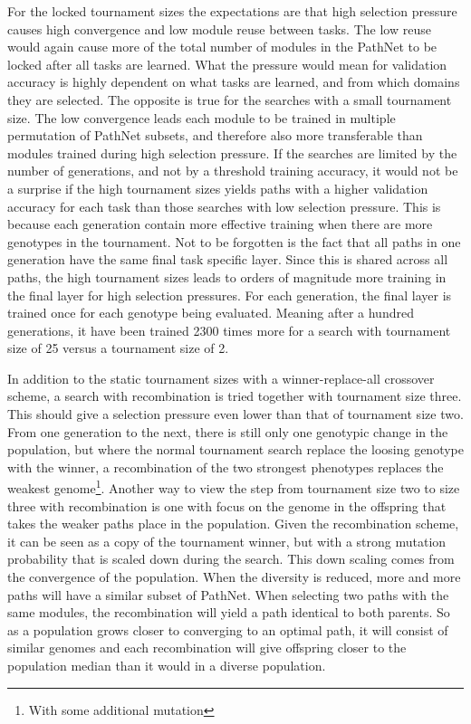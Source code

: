 For the locked tournament sizes the expectations are that high selection pressure causes high convergence and low module reuse between tasks. The low reuse would again cause more of the total number of modules in the PathNet to be locked after all tasks are learned. What the pressure would mean for validation accuracy is highly dependent on what tasks are learned, and from which domains they are selected. 
The opposite is true for the searches with a small tournament size. The low convergence leads each module to be trained in multiple permutation of PathNet subsets, and therefore also more transferable than modules trained during high selection pressure. If the searches are limited by the number of generations, and not by a threshold training accuracy, it would not be a surprise if the high tournament sizes yields paths with a higher validation accuracy for each task than those searches with low selection pressure. This is because each generation contain more effective training when there are more genotypes in the tournament. 
Not to be forgotten is the fact that all paths in one generation have the same final task specific layer.  Since this is shared across all paths, the high tournament sizes leads to orders of magnitude more training in the final layer for high selection pressures. For each generation, the final layer is trained once for each genotype being evaluated. Meaning after a hundred generations, it have been trained 2300 times more for a search with tournament size of 25 versus a tournament size of 2. 


In addition to the static tournament sizes with a winner-replace-all crossover scheme, a search with recombination is tried together with tournament size three.  This should give a selection pressure even lower than that of tournament size two. From one generation to the next, there is still only one genotypic change in the population, but where the normal tournament search replace the loosing genotype with the winner, a recombination of the two strongest phenotypes replaces the weakest genome\footnote{With some additional mutation}.  Another way to view the step from tournament size two to size three with recombination is one with focus on the genome in the offspring that takes the weaker paths place in the population. Given the recombination scheme, it can be seen as a copy of the tournament winner, but with a strong mutation probability that is scaled down during the search. This down scaling comes from the convergence of the population. When the diversity is reduced, more and more paths will have a similar subset of PathNet. When selecting two paths with the same modules, the recombination will yield a path identical to both parents. So as a population grows closer to converging to an optimal path, it will consist of similar genomes and each recombination will give offspring closer to the population median than it would in a diverse population. 

